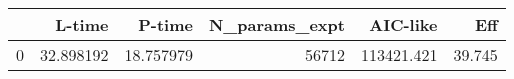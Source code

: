 \begin{tabular}{lrrrrr}
\toprule
{} &     L-time &     P-time &  N\_params\_expt &    AIC-like &     Eff \\
\midrule
0 &  32.898192 &  18.757979 &          56712 &  113421.421 &  39.745 \\
\bottomrule
\end{tabular}
